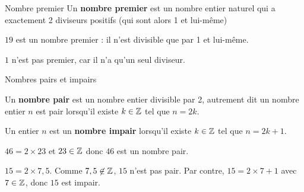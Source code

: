 \begin{pageCours}
\begin{minipage}{0.5\linewidth}
\begin{DefT}{Nombre premier}
Un \textbf{nombre premier} est un nombre entier naturel qui a exactement 2 diviseurs positifs (qui sont alors 1 et lui-même) 

\end{DefT}
\end{minipage}
\begin{minipage}{0.5\linewidth}
\begin{Ex} 

  $19$ est un nombre premier :  il n'est divisible que par 1 et lui-même.

  $1$ n'est pas premier, car il n'a qu'un seul diviseur.  
\end{Ex}
 \end{minipage}


\begin{DefT}{Nombres pairs et impairs}

  Un \textbf{nombre pair} est un nombre entier divisible par 2, autrement
  dit un nombre entier $n$ est pair lorsqu'il existe $k \in \mathbb Z$
  tel que $n=2k$.

  Un entier $n$ est un \textbf{nombre impair} lorsqu'il existe $k \in \mathbb Z$
  tel que $n=2k+1$.
\end{DefT}


\begin{Exs} 
$46 = 2 \times 23$ et $23\in\mathbb Z$ donc $46$ est un nombre pair.

  $15= 2 \times 7,5$. Comme $7,5 \not\in\mathbb Z$, $15$ n'est pas pair. Par contre,
  $15=2 \times 7+1$ avec $7 \in \mathbb Z$, donc $15$ est impair.
\end{Exs}


\end{pageCours} 
